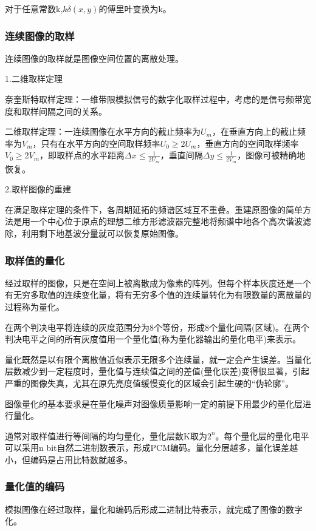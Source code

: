 \documentclass[11pt]{article}
\begin{document}
\noindent 对于任意常数k,$k\delta(x,y)$的傅里叶变换为k。
\subsubsection{连续图像的取样}
连续图像的取样就是图像空间位置的离散处理。

1.二维取样定理

奈奎斯特取样定理：一维带限模拟信号的数字化取样过程中，考虑的是信号频带宽度和取样间隔之间的关系。

二维取样定理：一连续图像在水平方向的截止频率为$U_m$，在垂直方向上的截止频率为$V_m$，只有在水平方向的空间取样频率$U_0\geqslant2U_m$，垂直方向的空间取样频率$V_0\geqslant2V_m$，即取样点的水平距离$\Delta x\leqslant\frac{1}{2U_m}$，垂直间隔$\Delta y \leqslant\frac{1}{2V_m}$，图像可被精确地恢复。

2.取样图像的重建

在满足取样定理的条件下，各周期延拓的频谱区域互不重叠。重建原图像的简单方法是用一个中心位于原点的理想二维方形滤波器完整地将频谱中地各个高次谐波滤除，利用剩下地基波分量就可以恢复原始图像。

\subsubsection{取样值的量化}
经过取样的图像，只是在空间上被离散成为像素的阵列。但每个样本灰度还是一个有无穷多取值的连续变化量，将有无穷多个值的连续量转化为有限数量的离散量的过程称为量化。

在两个判决电平将连续的灰度范围分为8个等份，形成8个量化间隔(区域)。在两个判决电平之间的所有灰度值用一个量化值(称为量化器输出的量化电平)来表示。

量化既然是以有限个离散值近似表示无限多个连续量，就一定会产生误差。当量化层数减少到一定程度时，量化值与连续值之间的差值(量化误差)变得很显著，引起严重的图像失真，尤其在原先亮度值缓慢变化的区域会引起生硬的“伪轮廓”。

图像量化的基本要求是在量化噪声对图像质量影响一定的前提下用最少的量化层进行量化。

通常对取样值进行等间隔的均匀量化，量化层数K取为$2^n$。每个量化层的量化电平可以采用n bit自然二进制数表示，形成PCM编码。量化分层越多，量化误差越小，但编码是占用比特数就越多。

\subsubsection{量化值的编码}
模拟图像在经过取样，量化和编码后形成二进制比特表示，就完成了图像的数字化。
\end{document}
